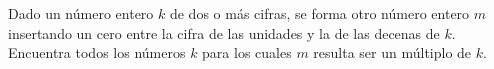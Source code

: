 Dado un número entero $k$ de dos o más cifras, se forma otro número entero $m$ insertando un cero entre la cifra de las unidades y la de las decenas de $k$. Encuentra todos los números $k$ para los cuales $m$ resulta ser un múltiplo de $k$.